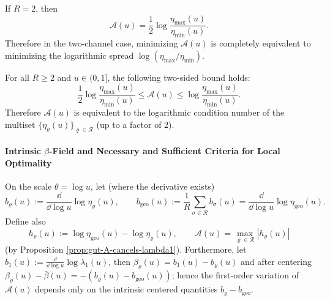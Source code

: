 \begin{corollary}\label{cor:gut-A-two-channel}
If \(R=2\), then
\[
\mathcal{A}(u)=\frac12\log\frac{\eta_{\max}(u)}{\eta_{\min}(u)}.
\]
Therefore in the two-channel case, minimizing \(\mathcal{A}(u)\) is completely equivalent to minimizing the logarithmic spread \(\log(\eta_{\max}/\eta_{\min})\).
\end{corollary}

\begin{corollary}\label{cor:gut-A-spread-equivalence}
For all \(R\ge 2\) and \(u\in(0,1]\), the following two-sided bound holds:
\[
\frac12\log\frac{\eta_{\max}(u)}{\eta_{\min}(u)}
\le
\mathcal{A}(u)
\le
\log\frac{\eta_{\max}(u)}{\eta_{\min}(u)}.
\]
Therefore \(\mathcal{A}(u)\) is equivalent to the logarithmic condition number of the multiset \(\{\eta_\varrho(u)\}_{\varrho\in\mathcal{R}}\) (up to a factor of \(2\)).
\end{corollary}

\paragraph{Intrinsic \texorpdfstring{$\beta$}{beta}-Field and Necessary and Sufficient Criteria for Local Optimality}
On the scale \(\theta=\log u\), let (where the derivative exists)
\[
b_\varrho(u):=\frac{\dd}{\dd\log u}\log\eta_\varrho(u),
\qquad
b_{\mathrm{geo}}(u):=\frac{1}{R}\sum_{\sigma\in\mathcal{R}}b_\sigma(u)
=\frac{\dd}{\dd\log u}\log\eta_{\mathrm{geo}}(u).
\]
Define also
\[
h_\varrho(u):=\log\eta_{\mathrm{geo}}(u)-\log\eta_\varrho(u),
\qquad
\mathcal{A}(u)=\max_{\varrho\in\mathcal{R}}|h_\varrho(u)|
\]
(by Proposition \ref{prop:gut-A-cancels-lambda1}).
Furthermore, let \(b_1(u):=\frac{\dd}{\dd\log u}\log\lambda_1(u)\), then
\(
\beta_\varrho(u)=b_1(u)-b_\varrho(u)
\)
and after centering
\(
\beta_\varrho(u)-\bar\beta(u)=-(b_\varrho(u)-b_{\mathrm{geo}}(u))
\);
hence the first-order variation of \(\mathcal{A}(u)\) depends only on the intrinsic centered quantities \(b_\varrho-b_{\mathrm{geo}}\).

